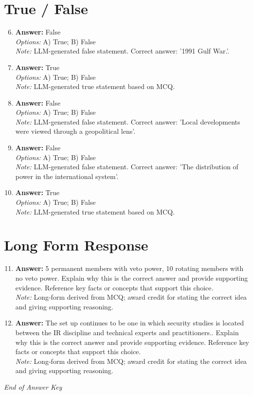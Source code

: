 \documentclass[12pt]{article}
\begin{document}
\section*{True / False}
\begin{enumerate}[label=\arabic*.]
\setcounter{enumi}{5}
\item \textbf{Answer:} False
\\ \textit{Options:} A) True; B) False
\\ \textit{Note:} LLM-generated false statement. Correct answer: '1991 Gulf War.'.
\item \textbf{Answer:} True
\\ \textit{Options:} A) True; B) False
\\ \textit{Note:} LLM-generated true statement based on MCQ.
\item \textbf{Answer:} False
\\ \textit{Options:} A) True; B) False
\\ \textit{Note:} LLM-generated false statement. Correct answer: 'Local developments were viewed through a geopolitical lens'.
\item \textbf{Answer:} False
\\ \textit{Options:} A) True; B) False
\\ \textit{Note:} LLM-generated false statement. Correct answer: 'The distribution of power in the international system'.
\item \textbf{Answer:} True
\\ \textit{Options:} A) True; B) False
\\ \textit{Note:} LLM-generated true statement based on MCQ.
\end{enumerate}

\section*{Long Form Response}
\begin{enumerate}[label=\arabic*.]
\setcounter{enumi}{10}
\item \textbf{Answer:} 5 permanent members with veto power, 10 rotating members with no veto power. Explain why this is the correct answer and provide supporting evidence. Reference key facts or concepts that support this choice.
\\ \textit{Note:} Long-form derived from MCQ; award credit for stating the correct idea and giving supporting reasoning.
\item \textbf{Answer:} The set up continues to be one in which security studies is located between the IR discipline and technical experts and practitioners.. Explain why this is the correct answer and provide supporting evidence. Reference key facts or concepts that support this choice.
\\ \textit{Note:} Long-form derived from MCQ; award credit for stating the correct idea and giving supporting reasoning.
\end{enumerate}

\vfill
\noindent\textit{End of Answer Key}
\end{document}
